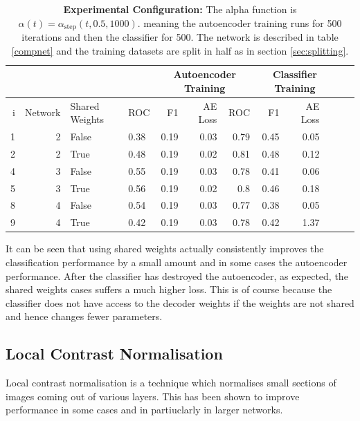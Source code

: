 \begin{table}[!h] \centering
{\small
\begin{tabular}{rrllrrrrrrrr}
  &&&&   \multicolumn{3}{|c|}{Autoencoder Training} &  \multicolumn{3}{c|}{Classifier Training}    \\
\hline
  i & Network               &   Shared Weights &    ROC&F1&AE Loss & ROC & F1 & AE Loss \\
\hline
 1 & 2    & False     &    0.38 &   0.19 &     0.03 &    0.79 &   0.45 &     0.05 \\
 2 & 2    & True      &    0.48 &   0.19 &     0.02 &    0.81 &   0.48 &     0.12 \\
\hline
4 & 3    & False     &    0.55 &   0.19 &     0.03 &    0.78 &   0.41 &     0.06 \\
5 & 3    & True      &    0.56 &   0.19 &     0.02 &    0.8  &   0.46 &     0.18 \\
\hline
8 & 4     & False     &    0.54 &   0.19 &     0.03 &    0.77 &   0.38 &     0.05 \\
9 & 4     & True      &    0.42 &   0.19 &     0.03 &    0.78 &   0.42 &     1.37 \\
 \hline
\end{tabular}}\caption{{\bf Experimental Configuration:}
The alpha function is $\alpha(t)=\alpha_{\text{step}}(t,0.5,1000)$.
meaning the autoencoder training runs for 500 iterations and then the classifier for 500.
The network is described in table \ref{compnet} and the training datasets are split in half as in section
\ref{sec:splitting}.} \label{tab:sharedweights} \end{table}

It can be seen that using shared weights actually consistently improves the classification
performance by a small amount and in some cases the autoencoder performance. After the classifier has
destroyed the autoencoder, as expected, the shared weights cases suffers a much higher loss. This is of course
because the classifier does not have access to the decoder weights if the weights are not shared and hence
changes fewer parameters.
%
%
%
%
%
\subsection{Local Contrast Normalisation}
Local contrast normalisation is a technique which normalises small sections of
images coming out of various layers. This has been shown to improve performance
in some cases and in partiuclarly in larger networks.


